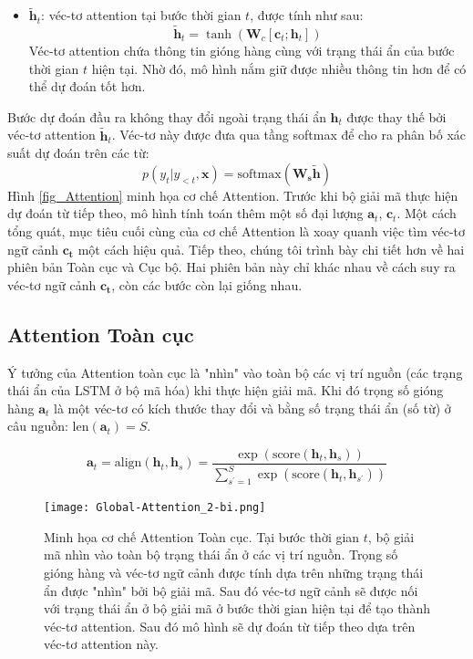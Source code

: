 \begin{itemize}
	\item $\bm{\tilde{h}}_t$: véc-tơ attention tại bước thời gian $t$, được tính như sau:
	\begin{equation}
	\boldsymbol{\tilde{h}}_t = \tanh(\bm{W}_c[\bm{c}_t;\bm{h}_t])
	\end{equation}
	Véc-tơ attention chứa thông tin gióng hàng cùng với trạng thái ẩn của bước thời gian $t$ hiện tại. Nhờ đó, mô hình nắm giữ được nhiều thông tin hơn để có thể dự đoán tốt hơn.
\end{itemize}
Bước dự đoán đầu ra không thay đổi ngoài trạng thái ẩn $\bm{h}_t$ được thay thế bởi véc-tơ attention $\bm{\tilde{h}}_t$. Véc-tơ này được đưa qua tầng softmax để cho ra phân bố xác suất dự đoán trên các từ:
\begin{equation}
p(y_t | y_{<t}, \bm{x}) = \text{softmax}(\bm{W_s\tilde{h}})
\end{equation}
Hình \ref{fig_Attention} minh họa cơ chế Attention. Trước khi bộ giải mã thực hiện dự đoán từ tiếp theo, mô hình tính toán thêm một số đại lượng $\bm{a}_t$, $\bm{c}_t$. Một cách tổng quát, mục tiêu cuối cùng của cơ chế Attention là xoay quanh việc tìm véc-tơ ngữ cảnh $\bm{c_t}$ một cách hiệu quả.
Tiếp theo, chúng tôi trình bày chi tiết hơn về hai phiên bản Toàn cục và Cục bộ. Hai phiên bản này chỉ khác nhau về cách suy ra véc-tơ ngữ cảnh $\bm{c_t}$, còn các bước còn lại giống nhau.
\subsection{Attention Toàn cục}
Ý tưởng của Attention toàn cục là "nhìn" vào toàn bộ các vị trí nguồn (các trạng thái ẩn của LSTM ở bộ mã hóa) khi thực hiện giải mã.
Khi đó trọng số gióng hàng $\bm{a}_t$ là một véc-tơ có kích thước thay đổi và bằng số trạng thái ẩn (số từ) ở câu nguồn: $\text{len}(\bm{a}_t) = S$.

\begin{equation}
\bm{a}_t = \text{align}(\bm{h}_t, \bm{h}_s) = \frac{\exp\left(\text{score}(\bm{h}_t, \bm{h}_s)\right)}{\sum^{S}_{s^{'}=1}\exp\left(\text{score}(\bm{h}_t, \bm{h}_{s^{'}})\right)}
\end{equation}

\begin{figure}
	\centering
	\texttt{[image: Global-Attention\_2-bi.png]}
	\caption[Minh họa cơ chế Attention Toàn cục.]{Minh họa cơ chế Attention Toàn cục. Tại bước thời gian $t$, bộ giải mã nhìn vào toàn bộ trạng thái ẩn ở các vị trí nguồn. Trọng số gióng hàng và véc-tơ ngữ cảnh được tính dựa trên những trạng thái ẩn được "nhìn" bởi bộ giải mã. Sau đó véc-tơ ngữ cảnh sẽ được nối với trạng thái ẩn ở bộ giải mã ở bước thời gian hiện tại để tạo thành véc-tơ attention. Sau đó mô hình sẽ dự đoán từ tiếp theo dựa trên véc-tơ attention này.}
	\label{fig_Global_Attention}
\end{figure}

